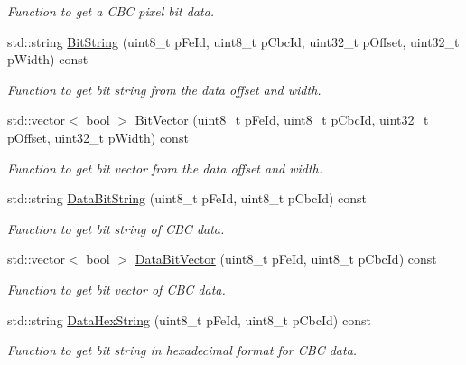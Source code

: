 \begin{DoxyCompactItemize}
\begin{DoxyCompactList}\small\item\em Function to get a C\-B\-C pixel bit data. \end{DoxyCompactList}\item 
std\-::string \hyperlink{class_ph2___hw_interface_1_1_event_a67261ba2ea976e1c265c8aa7fe1a4b2d}{Bit\-String} (uint8\-\_\-t p\-Fe\-Id, uint8\-\_\-t p\-Cbc\-Id, uint32\-\_\-t p\-Offset, uint32\-\_\-t p\-Width) const 
\begin{DoxyCompactList}\small\item\em Function to get bit string from the data offset and width. \end{DoxyCompactList}\item 
std\-::vector$<$ bool $>$ \hyperlink{class_ph2___hw_interface_1_1_event_ab83e11f21873bd5beebd1049671ce3da}{Bit\-Vector} (uint8\-\_\-t p\-Fe\-Id, uint8\-\_\-t p\-Cbc\-Id, uint32\-\_\-t p\-Offset, uint32\-\_\-t p\-Width) const 
\begin{DoxyCompactList}\small\item\em Function to get bit vector from the data offset and width. \end{DoxyCompactList}\item 
std\-::string \hyperlink{class_ph2___hw_interface_1_1_event_adb005c7fbcd56f6cb66a4b83b185886b}{Data\-Bit\-String} (uint8\-\_\-t p\-Fe\-Id, uint8\-\_\-t p\-Cbc\-Id) const 
\begin{DoxyCompactList}\small\item\em Function to get bit string of C\-B\-C data. \end{DoxyCompactList}\item 
std\-::vector$<$ bool $>$ \hyperlink{class_ph2___hw_interface_1_1_event_a54db44c9de8f4ca816d8cadcaa733260}{Data\-Bit\-Vector} (uint8\-\_\-t p\-Fe\-Id, uint8\-\_\-t p\-Cbc\-Id) const 
\begin{DoxyCompactList}\small\item\em Function to get bit vector of C\-B\-C data. \end{DoxyCompactList}\item 
std\-::string \hyperlink{class_ph2___hw_interface_1_1_event_ab7a41db929dba07f724a0b0f3e5ba626}{Data\-Hex\-String} (uint8\-\_\-t p\-Fe\-Id, uint8\-\_\-t p\-Cbc\-Id) const 
\begin{DoxyCompactList}\small\item\em Function to get bit string in hexadecimal format for C\-B\-C data. \end{DoxyCompactList}\item 

\end{DoxyCompactItemize}
